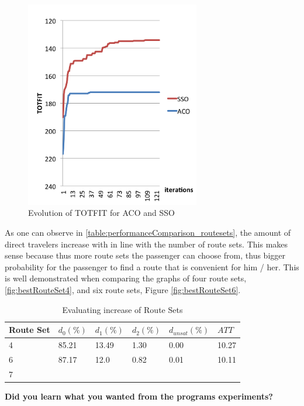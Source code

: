  \begin{figure}[H]
    \begin{center}
    \includegraphics[width=3in]{assets/acovsssoNEW.png}
    \end{center}
    \caption{Evolution of TOTFIT for ACO and SSO }
    \label{fig:acovssso} 
\end{figure}

As one can observe in \vref{table:performanceComparison_routesets}, the amount of direct travelers increase with in line with the number of route sets. This makes sense because thus more route sets the passenger can choose from, thus bigger probability for the passenger to find a route that is convenient for him / her. This is well demonstrated when comparing the graphs of four route sets, \vref{fig:bestRouteSet4}, and six route sets, Figure \vref{fig:bestRouteSet6}.  

 \begin{table}[H]
    \centering
    \begin{tabular}{|l||l|l|l|l|l|}
    \hline
    Route Set & $d_0(\%)$ & $d_1(\%)$ & $d_2(\%)$ & $d_{unsat}(\%)$ & $ATT$ \\
    \hline
    4 & 85.21 & 13.49 & 1.30 & 0.00 & 10.27\\
    \hline
    6 & 87.17 & 12.0 & 0.82 & 0.01 & 10.11\\
    \hline
    7 \\
    \hline
    \end{tabular}
    \caption {Evaluating increase of Route Sets}
    \label{table:performanceComparison_routesets}
\end{table}

\textbf{Did you learn what you wanted from the programs experiments?}